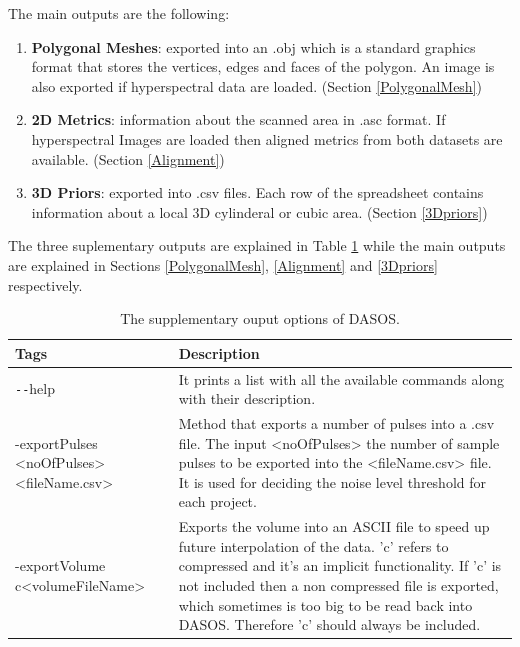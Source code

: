 \documentclass{article}
\begin{document}
			\par The main outputs are the following:
			\begin{enumerate}
				\item \textbf{Polygonal Meshes}: exported into an .obj which is a standard graphics format that stores the vertices, edges and faces of the polygon. An image is also exported if hyperspectral data are loaded. (Section \ref{PolygonalMesh})
				\item \textbf{2D Metrics}: information about the scanned area in .asc format. If hyperspectral Images are loaded then aligned metrics from both datasets are available. (Section \ref{Alignment})
				\item \textbf{3D Priors}: exported into .csv files. Each row of the spreadsheet contains information about a local 3D cylinderal or cubic area. (Section \ref{3Dpriors})
			\end{enumerate} 
		
		The three suplementary outputs are explained in Table \ref{table:supTags} while the main outputs are explained in Sections \ref{PolygonalMesh}, \ref{Alignment} and \ref{3Dpriors} respectively.
		\begin{table}[!htbp]
			\centering
			\begin{tabular}{|p{2.9cm}|p{11.2cm}|}
				\toprule
				\textbf{Tags}  & \textbf{Description}  \\
				\midrule
				\texttt{-{}-}help & It prints a list with all the available commands along with their description.\\
				\midrule
				-exportPulses  \newline<fileName.csv> & Method that exports a number of pulses into a .csv file. The input <noOfPulses> the number of sample pulses to be exported into the <fileName.csv> file. It is used for deciding the noise level threshold for each project. \\
				\cmidrule(r){1-1}\cmidrule(l){2-2}
				-exportVolume c\newline <volumeFileName> & Exports the volume into an ASCII file to speed up future interpolation of the data. 'c' refers to compressed and it's an implicit functionality. If 'c' is not included then a non compressed file is exported, which sometimes is too big to be read back into DASOS. Therefore 'c' should always be included. \\	
				\bottomrule		
			\end{tabular}
			\caption{The supplementary ouput options of DASOS.}
			\label{table:supTags}
		\end{table}
	
\end{document}
